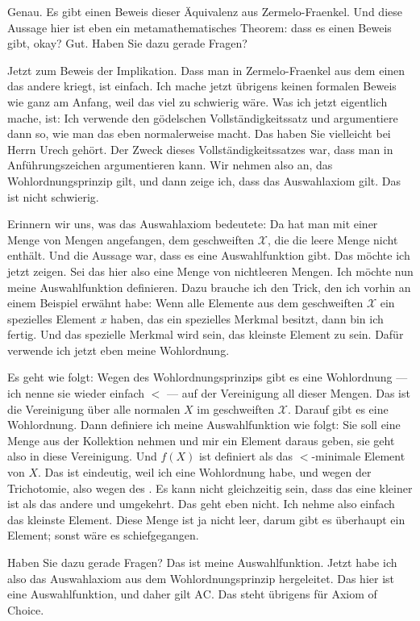 \begin{spoken-clean}[continued]
Genau. Es gibt einen Beweis dieser Äquivalenz aus Zermelo-Fraenkel. Und diese Aussage hier ist eben ein metamathematisches Theorem: dass es einen Beweis gibt, okay? Gut. Haben Sie dazu gerade Fragen?

Jetzt zum Beweis der Implikation. Dass man in Zermelo-Fraenkel aus dem einen das andere kriegt, ist einfach. Ich mache jetzt übrigens keinen formalen Beweis wie ganz am Anfang, weil das viel zu schwierig wäre. Was ich jetzt eigentlich mache, ist: Ich verwende den gödelschen Vollständigkeitssatz und argumentiere dann so, wie man das eben normalerweise macht. Das haben Sie vielleicht bei Herrn Urech gehört. Der Zweck dieses Vollständigkeitssatzes war, dass man in Anführungszeichen  argumentieren kann. Wir nehmen also an, das Wohlordnungsprinzip gilt, und dann zeige ich, dass das Auswahlaxiom gilt. Das ist nicht schwierig.

Erinnern wir uns, was das Auswahlaxiom bedeutete: Da hat man mit einer Menge von Mengen angefangen, dem geschweiften $\mathcal{X}$, die die leere Menge nicht enthält. Und die Aussage war, dass es eine Auswahlfunktion gibt. Das möchte ich jetzt zeigen. Sei das hier also eine Menge von nichtleeren Mengen. Ich möchte nun meine Auswahlfunktion definieren. Dazu brauche ich den Trick, den ich vorhin an einem Beispiel erwähnt habe: Wenn alle Elemente aus dem geschweiften $\mathcal{X}$ ein spezielles Element $x$ haben, das ein spezielles Merkmal besitzt, dann bin ich fertig. Und das spezielle Merkmal wird sein, das kleinste Element zu sein. Dafür verwende ich jetzt eben meine Wohlordnung.

Es geht wie folgt: Wegen des Wohlordnungsprinzips gibt es eine Wohlordnung --- ich nenne sie wieder einfach $<$ --- auf der Vereinigung all dieser Mengen. Das ist die Vereinigung über alle normalen $X$ im geschweiften $\mathcal{X}$. Darauf gibt es eine Wohlordnung. Dann definiere ich meine Auswahlfunktion wie folgt: Sie soll eine Menge aus der Kollektion nehmen und mir ein Element daraus geben, sie geht also in diese Vereinigung. Und $f(X)$ ist definiert als das $<$-minimale Element von $X$. Das ist eindeutig, weil ich eine Wohlordnung habe, und wegen der Trichotomie, also wegen des . Es kann nicht gleichzeitig sein, dass das eine kleiner ist als das andere und umgekehrt. Das geht eben nicht. Ich nehme also einfach das kleinste Element. Diese Menge ist ja nicht leer, darum gibt es überhaupt ein Element; sonst wäre es schiefgegangen. 

Haben Sie dazu gerade Fragen? Das ist meine Auswahlfunktion. Jetzt habe ich also das Auswahlaxiom aus dem Wohlordnungsprinzip hergeleitet. Das hier ist eine Auswahlfunktion, und daher gilt $\text{AC}$. Das steht übrigens für Axiom of Choice.
\end{spoken-clean}

